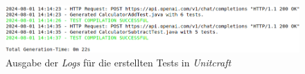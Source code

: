 \begin{figure}[h]
    \centering
    \includegraphics[width=1\textwidth]{Assets/Images/tests.png}
    \caption{Ausgabe der \textit{Logs} für die erstellten Tests in \textit{Unitcraft}}
    \label{fig:tests}
\end{figure}